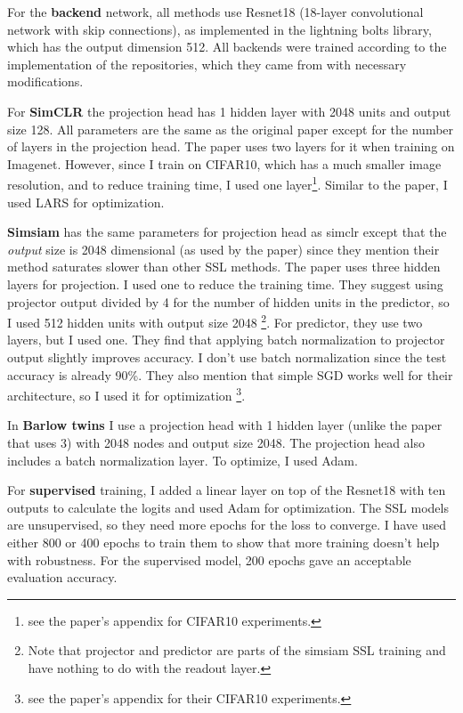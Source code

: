 \documentclass[../thesis.tex]{subfiles}
\begin{document}
	For the \textbf{backend} network, all methods use Resnet18 (18-layer convolutional network with skip connections), as implemented in the lightning bolts library, which has the output dimension 512. All backends were trained according to the implementation of the repositories, which they came from with necessary modifications. 
	
	For \textbf{SimCLR} \cite{simclr_chen_simple_2020} the projection head has 1 hidden layer with 2048 units and output size 128. All parameters are the same as the original paper except for the number of layers in the projection head. The paper uses two layers for it when training on Imagenet. However, since I train on CIFAR10, which has a much smaller image resolution, and to reduce training time, I used one layer\footnote{see the paper's appendix for CIFAR10 experiments.}. Similar to the paper, I used LARS for optimization. 
	
	\textbf{Simsiam} \cite{simsiam} has the same parameters for projection head as simclr except that the \textit{output} size is 2048 dimensional (as used by the paper) since they mention their method saturates slower than other SSL methods. The paper uses three hidden layers for projection. I used one to reduce the training time. They suggest using projector output divided by 4 for the number of hidden units in the predictor, so I used 512 hidden units with output size 2048 \footnote{Note that projector and predictor are parts of the simsiam SSL training and have nothing to do with the readout layer.}. For predictor, they use two layers, but I used one. They find that applying batch normalization to projector output slightly improves accuracy. I don't use batch normalization since the test accuracy is already 90\%. They also mention that simple SGD works well for their architecture, so I used it for optimization \footnote {see the paper's appendix for their CIFAR10 experiments.}. 
	
	In \textbf{Barlow twins} \cite{barlow_twins}  I use a projection head with 1 hidden layer (unlike the paper that uses 3) with 2048 nodes and output size 2048. The projection head also includes a batch normalization layer. To optimize, I used Adam. 
	
	For \textbf{supervised} training, I added a linear layer on top of the Resnet18 with ten outputs to calculate the logits and used Adam for optimization. The SSL models are unsupervised, so they need more epochs for the loss to converge. I have used either 800 or 400 epochs to train them to show that more training doesn't help with robustness. For the supervised model, 200 epochs gave an acceptable evaluation accuracy.  
	
\end{document}
